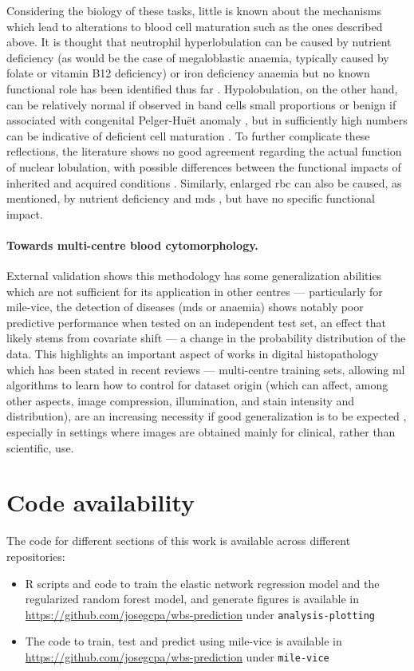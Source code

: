 Considering the biology of these tasks, little is known about the mechanisms which lead to alterations to blood cell maturation such as the ones described above. It is thought that neutrophil hyperlobulation can be caused by nutrient deficiency (as would be the case of megaloblastic anaemia, typically caused by folate or vitamin B12 deficiency) or iron deficiency anaemia but no known functional role has been identified thus far \cite{Manley2018-xo}. Hypolobulation, on the other hand, can be relatively normal if observed in band cells small proportions or benign if associated with congenital Pelger-Huët anomaly \cite{Colella2012-so}, but in sufficiently high numbers can be indicative of deficient cell maturation \cite{Aster2020-cu}. To further complicate these reflections, the literature shows no good agreement regarding the actual function of nuclear lobulation, with possible differences between the functional impacts of inherited and acquired conditions \cite{Manley2018-xo}. Similarly, enlarged \ac{rbc} can also be caused, as mentioned, by nutrient deficiency and \ac{mds} \cite{Aslinia2006-en}, but have no specific functional impact. 

\paragraph{Towards multi-centre blood cytomorphology.} External validation shows this methodology has some generalization abilities which are not sufficient for its application in other centres --- particularly for \ac{mile-vice}, the detection of diseases (\ac{mds} or anaemia) shows notably poor predictive performance when tested on an independent test set, an effect that likely stems from covariate shift --- a change in the probability distribution of the data. This highlights an important aspect of works in digital histopathology which has been stated in recent reviews --- multi-centre training sets, allowing \ac{ml} algorithms to learn how to control for dataset origin (which can affect, among other aspects, image compression, illumination, and stain intensity and distribution), are an increasing necessity if good generalization is to be expected \cite{Van_der_Laak2021-id}, especially in settings where images are obtained mainly for clinical, rather than scientific, use.

\section{Code availability}

The code for different sections of this work is available across different repositories:

\begin{itemize}
    \item R scripts and code to train the elastic network regression model and the regularized random forest model, and generate figures is available in \url{https://github.com/josegcpa/wbs-prediction} under \texttt{analysis-plotting}
    \item The code to train, test and predict using \ac{mile-vice} is available in \url{https://github.com/josegcpa/wbs-prediction} under \texttt{mile-vice}
\end{itemize}
